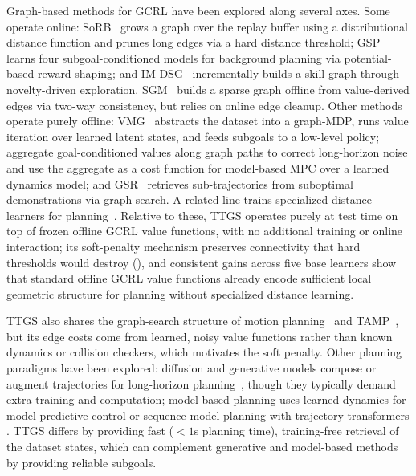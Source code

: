 \documentclass{article} %
\begin{document}
Graph-based methods for GCRL have been explored along several axes. Some operate online: SoRB~\citep{Eysenbach2019SoRB} grows a graph over the replay buffer using a distributional distance function and prunes long edges via a hard distance threshold; GSP~\citep{lo2024gsp} learns four subgoal-conditioned models for background planning via potential-based reward shaping; and IM-DSG~\citep{bagaria2025imdsg} incrementally builds a skill graph through novelty-driven exploration. SGM~\citep{emmos2020sparsegraphical} builds a sparse graph offline from value-derived edges via two-way consistency, but relies on online edge cleanup. Other methods operate purely offline: VMG~\citep{zhu2023valuememorygraphgraphstructured} abstracts the dataset into a graph-MDP, runs value iteration over learned latent states, and feeds subgoals to a low-level policy; \citet{bagatella2023goal} aggregate goal-conditioned values along graph paths to correct long-horizon noise and use the aggregate as a cost function for model-based MPC over a learned dynamics model; and GSR~\citep{yin2024offlineimitationlearninggraph} retrieves sub-trajectories from suboptimal demonstrations via graph search. A related line trains specialized distance learners for planning~\citep{savinov2018semiparametrictopologicalmemorynavigation, zhang2021worldmodelgraphlearning,gas_baek2025}. Relative to these, TTGS operates purely at test time on top of frozen offline GCRL value functions, with no additional training or online interaction; its soft-penalty mechanism preserves connectivity that hard thresholds would destroy (), and consistent gains across five base learners show that standard offline GCRL value functions already encode sufficient local geometric structure for planning without specialized distance learning.

TTGS also shares the graph-search structure of motion planning~\citep{Kavraki1996PRM} and TAMP~\citep{Garrett2021TAMP}, but its edge costs come from learned, noisy value functions rather than known dynamics or collision checkers, which motivates the soft penalty. Other planning paradigms have been explored: diffusion and generative models compose or augment trajectories for long-horizon planning~\citep{Janner2022Diffuser, Ajay2023DecisionDiffuser, Luo2025CompDiffuser, Zhang2025InferenceScaling, Lee2025SCoTS}, though they typically demand extra training and computation; model-based planning uses learned dynamics for model-predictive control \citep{Williams2017MPPI, Chua2018PETS, Hafner2019PlaNet, Hansen2022TDMPC} or sequence-model planning with trajectory transformers \citep{Janner2021TrajectoryTransformer}. TTGS differs by providing fast ($<1$s planning time), training-free retrieval of the dataset states, which can complement generative and model-based methods by providing reliable subgoals.
\end{document}
